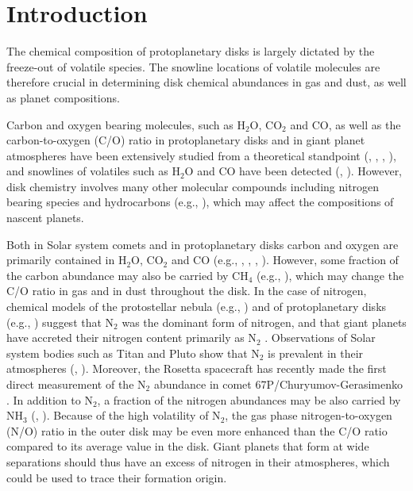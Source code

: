 \documentclass[apj]{emulateapj}
\begin{document}
\begin{abstract}
\end{abstract}

\section{Introduction}
\label{sec:intro}

The chemical composition of protoplanetary disks is largely dictated by the freeze-out of volatile species. The snowline locations of volatile molecules are therefore crucial in determining disk chemical abundances in gas and dust, as well as planet compositions.  

Carbon and oxygen bearing molecules, such as H$_2$O, CO$_2$ and CO, as well as the carbon-to-oxygen (C/O) ratio in protoplanetary disks and in giant planet atmospheres have been extensively studied from a theoretical standpoint (\citealt{oberg11}, \citealt{alidib14}, \citealt{madhu14}, \citealt{molliere15}), and snowlines of volatiles such as H$_2$O and CO have been detected (\citealt{zhang13}, \citealt{qi13}). However, disk chemistry involves many other molecular compounds \citep{henning13} including nitrogen bearing species and hydrocarbons (e.g., \citealt{mandell12}), which may affect the compositions of nascent planets.

Both in Solar system comets and in protoplanetary disks carbon and oxygen are primarily contained in H$_2$O, CO$_2$ and CO (e.g., \citealt{lodders03}, \citealt{mumma11}, \citealt{oberg11}, \citealt{boogert15}). However, some fraction of the carbon abundance may also be carried by CH$_4$ (e.g., \citealt{oberg08}), which may change the C/O ratio in gas and in dust throughout the disk. In the case of nitrogen, chemical models of the protostellar nebula (e.g., \citealt{owen01}) and of protoplanetary disks (e.g., \citealt{rodgers02}) suggest that N$_2$ was the dominant form of nitrogen, and that giant planets have accreted their nitrogen content primarily as N$_2$ \citep{mousis14}. Observations of Solar system bodies such as Titan and Pluto show that N$_2$ is prevalent in their atmospheres (\citealt{cruikshank93}, \citealt{owen93}).  Moreover, the Rosetta spacecraft has recently made the first direct measurement of the N$_2$ abundance in comet 67P/Churyumov-Gerasimenko \citep{rubin15}. In addition to N$_2$, a fraction of the nitrogen abundances may be also carried by NH$_3$ (\citealt{bottinelli10}, \citealt{mumma11}). Because of the high volatility of N$_2$, the gas phase nitrogen-to-oxygen (N/O) ratio in the outer disk may be even more enhanced than the C/O ratio compared to its average value in the disk. Giant planets that form at wide separations should thus have an excess of nitrogen in their atmospheres, which could be used to trace their formation origin.
\end{document}
